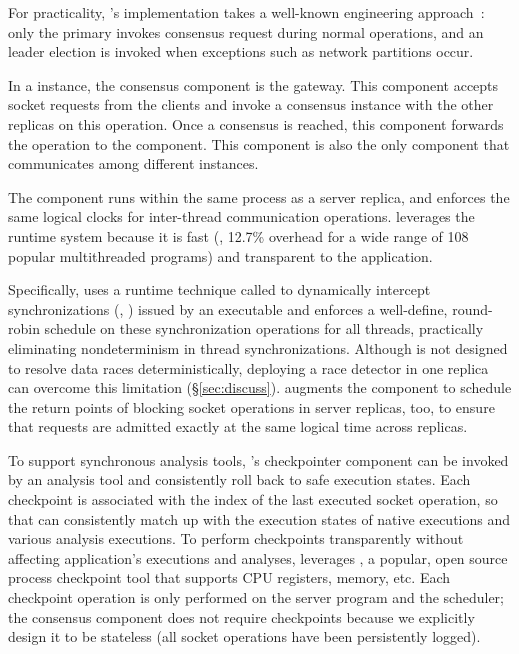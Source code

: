For practicality, \repbox's \paxos implementation takes a well-known 
engineering approach~\cite{paxos:practical}: only the primary invokes consensus 
request during normal operations, and an leader election is invoked when 
exceptions such as network partitions occur.


In a \xxx instance, the \paxos consensus component is the gateway.  This 
component accepts socket requests from the clients and invoke a \paxos 
consensus instance with the other replicas on this operation. Once a consensus 
is reached, this component forwards the operation to the \dmt component. This 
component is also the only \xxx component that communicates among different 
\xxx instances. 


The \dmt component runs within the same process as a server replica, and
enforces the same logical clocks for inter-thread communication
operations. \xxx leverages the \parrot~\cite{parrot:sosp13} \dmt runtime
system because it is fast (\ie, 12.7\% overhead for a wide range of 108 popular 
multithreaded programs) and transparent to the application.


Specifically, \parrot uses a runtime technique called \ldpreload to dynamically 
intercept \pthread synchronizations (\eg, \mutexlock) issued by an executable 
and enforces a well-define, round-robin schedule on these synchronization 
operations for all threads, practically eliminating nondeterminism in thread
synchronizations. Although \parrot is not designed to resolve data races
deterministically, deploying a race detector in one replica can overcome this 
limitation (\S\ref{sec:discuss}).  \xxx augments the \dmt component to schedule 
the return points of blocking socket operations in server replicas, too, to 
ensure that requests are admitted exactly at the same logical time across 
replicas.

To support synchronous analysis tools, \xxx's checkpointer component can be 
invoked 
by an analysis tool and consistently roll back to safe 
execution states. Each checkpoint is associated with the index of the last 
executed 
socket operation, so that \xxx can consistently match up with the execution 
states of native 
executions and various analysis executions. To perform checkpoints 
transparently without affecting application's executions and analyses, \xxx 
leverages \criu, a popular, open source process checkpoint tool that supports 
CPU registers, memory, etc. Each checkpoint operation is only performed on the 
server program and the \dmt scheduler; the \paxos consensus component does not 
require checkpoints because we explicitly design it to be stateless (all socket 
operations have been persistently logged). 

